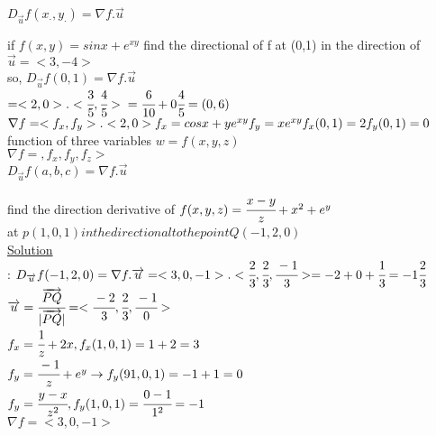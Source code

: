 \begin{theorem}
 $D_{\overrightarrow{u}} f(x_\cdot,y_\cdot) = \nabla f .{\overrightarrow{u}}$
\end{theorem}
\begin{example}
if $f(x,y) = sin x + e ^{xy}$ find the directional of f at (0,1) in the direction of ${\overrightarrow{u}} = <3,-4>$\\
so, $D_{\overrightarrow{u}} f(0,1)= \nabla f .{\overrightarrow{u}}$\\
$=<2,0> . <\cfrac{3}{5},\cfrac{4}{5}>\\
=\cfrac{6}{10} + 0\cfrac{4}{5} = (0,6)$\\
$\nabla f = <f_x,f_y> . <2,0>\\
f_x = cos x + y e^{xy} \\
f_y = x e^{xy} \\
f_x(0,1) = 2\\
f_y(0,1) = 0 $\\
function of three variables $w = f(x,y,z)$\\
$\nabla f = ,f_x,f_y,f_z>$\\
$D_{\overrightarrow{u}} f(a,b,c) = \nabla f . {\overrightarrow{u}}$\\
\end{example}
\noindent{\color{smalt(darkpowderblue)}\rule{\linewidth}{.2mm}}
\begin{example}
find the direction derivative of $f(x,y,z) = \cfrac{x - y}{z} + x^{2} + e^{y}$\\
at $p(1,0,1) in the directional to the point Q (-1,2,0)$\\
\underline{\textbf{\large}\color{smalt(darkpowderblue)}Solution}\\ : $D_{\overrightarrow{u}} f(-1,2,0) = \nabla f . {\overrightarrow{u}} = <3,0,-1>.<\cfrac{2}{3},\cfrac{2}{3},\cfrac{-1}{3}> = -2 + 0 + \cfrac{1}{3} = -1\cfrac{2}{3}$\\
${\overrightarrow{u}} = \cfrac{{\overrightarrow{PQ}}}{|{\overrightarrow{PQ}}|} = <\cfrac{-2}{3} , \cfrac{2}{3} , \cfrac{-1}{0}>$\\
$f_x = \cfrac{1}{z} + 2x , f_x(1,0,1) = 1+2 = 3$\\
$f_y = \cfrac{-1}{z} + e^{y} \rightarrow f_y(91,0,1) = -1 +1 = 0 $\\
$f_y = \cfrac{y-x}{z^{2}} , f_y(1,0,1) = \cfrac{0-1}{1^{2}} = -1 $\\
$\nabla f = <3,0,-1>$\\
\end{example}

